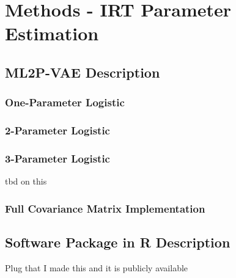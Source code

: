 \chapter{Methods - IRT Parameter Estimation}

\section{ML2P-VAE Description}

\subsection{One-Parameter Logistic}

\subsection{2-Parameter Logistic}

\subsection{3-Parameter Logistic}
tbd on this

\subsection{Full Covariance Matrix Implementation}

\section{Software Package in R Description}
Plug that I made this and it is publicly available




